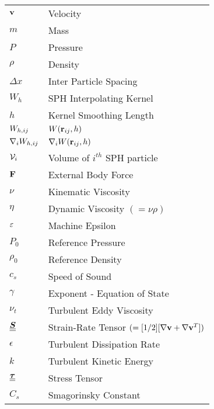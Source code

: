 \begin{longtable}{ll}
$\mathbf{v}$           & Velocity                          \\
$m$                  & Mass                              \\
$P$                  & Pressure                          \\
$\rho$               & Density                           \\
$\Delta x$           & Inter Particle Spacing            \\
$W_{h}$              & SPH Interpolating Kernel          \\
$h$                  & Kernel Smoothing Length           \\
$W_{h, ij}$               & $W(\mathbf{r}_{ij}, h)$                      \\
$\nabla_{i} W_{h, ij}$              & $\nabla_i W(\mathbf{r}_{ij},h)$              \\
$\mathcal{V}_i$             & Volume of $i^{th}$ SPH particle   \\
$\mathbf{F}$           & External Body Force               \\
$\nu$                & Kinematic Viscosity               \\
$\eta$               & Dynamic Viscosity $(=\nu \rho)$   \\
$\varepsilon$    & Machine Epsilon                   \\
$P_0$                & Reference Pressure                \\
$\rho_0$             & Reference Density                 \\
$c_s$                & Speed of Sound                    \\
$\gamma$             & Exponent - Equation of State      \\
$\nu_t$              & Turbulent Eddy Viscosity          \\
$\underline{\underline{\bm{S}}}$                   & Strain-Rate Tensor $(=[1/2][\nabla \mathbf{v} + \nabla \mathbf{v}^T])$                          \\
$\epsilon$           & Turbulent Dissipation Rate        \\
$k$                  & Turbulent Kinetic Energy          \\
$\underline{\underline{\bm{\tau}}}$      & Stress Tensor                     \\
$C_s $               & Smagorinsky Constant             
\end{longtable}